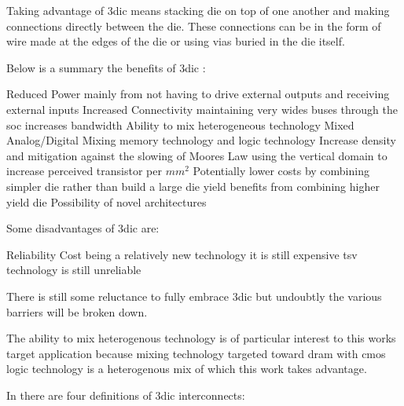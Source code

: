 Taking advantage of \ac{3dic} means stacking die on top of one another and making connections directly between the die. These connections can be in the form of wire made at the edges of the die or using vias buried in the die itself.


Below is a summary the benefits of \ac{3dic} :
\begin{outline}
  \1 Reduced Power
    \2 mainly from not having to drive external outputs and receiving external inputs
  \1 Increased Connectivity
    \2 maintaining very wides buses through the \ac{soc} increases bandwidth
  \1 Ability to mix heterogeneous technology
    \2 Mixed Analog/Digital
    \2 Mixing memory technology and logic technology
  \1 Increase density and mitigation against the slowing of Moores Law
    \2 using the vertical domain to increase perceived transistor per $mm^2$
  \1 Potentially lower costs by combining simpler die rather than build a large die
    \2 yield benefits from combining higher yield die
  \1 Possibility of novel architectures \cite{Kim2016}
\end{outline}

Some disadvantages of \ac{3dic} are:
\begin{outline}
  \1 Reliability
  \1 Cost
    \2 being a relatively new technology it is still expensive 
    \2 \ac{tsv} technology is still unreliable
\end{outline}

There is still some reluctance to fully embrace \ac{3dic} but undoubtly the various barriers will be broken down.

The ability to mix heterogenous technology is of particular interest to this works target application because mixing technology targeted toward \ac{dram} with cmos logic technology is a heterogenous mix of which this work takes advantage.

In \cite{itrs2015_interconn} there are four definitions of \ac{3dic} interconnects:

